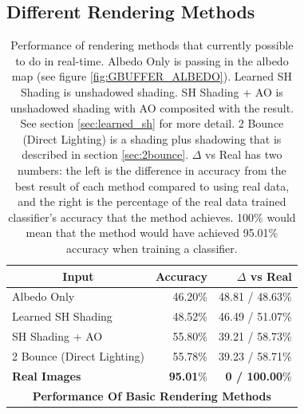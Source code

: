 \documentclass[10pt,twocolumn,letterpaper]{article}
\begin{document}
\subsection{Different Rendering Methods}
\begin{table}[]
\centering
\label{tblnonGI}
\begin{tabular}{|l|r|r|}
\hline
\multicolumn{1}{|c|}{\textbf{Input}} & \multicolumn{1}{r|}{\textbf{Accuracy}} & \multicolumn{1}{r|}{\textbf{$\Delta$ vs Real}} \\ \hline
Albedo Only                          & 46.20\%                                & 48.81 / 48.63\%                                \\
Learned SH Shading                   & 48.52\%                                & 46.49 / 51.07\%                                \\
SH Shading + AO                      & 55.80\%                                & 39.21 / 58.73\%                                \\
2 Bounce (Direct Lighting)           & 55.78\%                                & 39.23 / 58.71\%                                \\
\textbf{Real Images}                          & \textbf{95.01}\%                                & \textbf{0 / 100.00}\%                                   \\ \hline
\multicolumn{3}{|c|}{\textbf{Performance Of Basic Rendering Methods}}                                                          \\ \hline
\end{tabular}
\caption{Performance of rendering methods that currently possible to do in real-time. Albedo Only is passing in the albedo map (see figure \ref{fig:GBUFFER_ALBEDO}). Learned SH Shading is unshadowed shading. SH Shading + AO is unshadowed shading with AO composited with the result. See section \ref{sec:learned_sh} for more detail. 2 Bounce (Direct Lighting) is a shading plus shadowing that is described in section \ref{sec:2bounce}. $\Delta$ vs Real has two numbers: the left is the difference in accuracy from the best result of each method compared to using real data, and the right is the percentage of the real data trained classifier's accuracy that the method achieves.  100\% would mean that the method would have achieved 95.01\% accuracy when training a classifier.  } 
\end{table}
\end{document}
